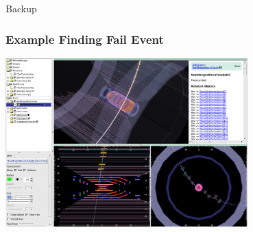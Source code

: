 \documentclass[18pt]{beamer}
\begin{document}
  \backupbegin

  \begin{frame}
    \begin{center}
      \huge Backup
    \end{center}
  \end{frame}

    \begin{frame}
    \begin{center}
      \frametitle{Example Finding Fail Event}
      \includegraphics[width=0.7\textwidth]{figures/b2display_example_1trackevt.png}
    \end{center}
  \end{frame}
\end{document}
